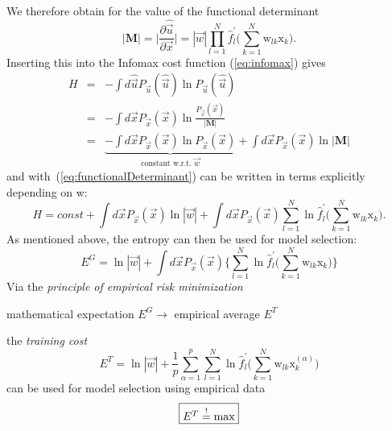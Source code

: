 We therefore obtain for the value of the functional determinant
\begin{equation} \label{eq:functionalDeterminant}
|\mathbf{M}| = 
	\Big| \frac{\partial \widehat{\vec{u}}}{\partial \vec{x}} \Big|
	= |\vec{w}| \prod\limits_{l = 1}^N  \widehat{f}_l^{'} \Bigg( 
		\sum\limits_{k = 1}^N \mathrm{w}_{lk} \mathrm{x}_k \Bigg).
\end{equation}
Inserting this into the Infomax cost function (\ref{eq:infomax}) gives 
\begin{eqnarray}
H & = & -\int d \widehat{\vec{u}} P_{\vec{u}} (\widehat{\vec{u}})
  \ln P_{\vec{u}} (\widehat{\vec{u}}) \\
& = &  
-\int d \vec{x} P_{\vec{x}} (\vec{x}) \ln \frac{P_{\vec{x}}(\vec{x})}{|\mathbf{M}|} \\
& = & 
\underbrace{-\int d \vec{x} P_{\vec{x}} (\vec{x}) \ln P_{\vec{x}}(\vec{x})}_{ \text{constant w.r.t. } \vec{w} } +
\int d \vec{x} P_{\vec{x}} (\vec{x}) \ln |\mathbf{M}|
\end{eqnarray}
and with~(\ref{eq:functionalDeterminant}) can be written in terms explicitly depending on w:
\begin{equation}
	H = const + \int d \vec{x} P_{\vec{x}} (\vec{x}) \ln |\vec{w}|
		+ \int d \vec{x} P_{\vec{x}} (\vec{x}) \sum\limits_{l = 1}^N
			\ln \widehat{f}_l^{'} \Bigg( \sum\limits_{k = 1}^N 
			\mathrm{w}_{lk} \mathrm{x}_k \Bigg).
\end{equation}
As mentioned above, the entropy can then be used for model selection:
\begin{equation} \tag{generalization cost}
	E^G = \ln |\vec{w}| + \int d \vec{x} P_{\vec{x}} (\vec{x})
		\Bigg\{ \sum\limits_{l = 1}^N \ln
			\widehat{f}_l^{'} \Bigg( \sum\limits_{k = 1}^N 
			\mathrm{w}_{lk} \mathrm{x}_k \Bigg)
		\Bigg\}
\end{equation}
Via the \emph{principle of empirical risk minimization}
\begin{center}
mathematical expectation $E^G \longrightarrow$ empirical average $E^T$
\end{center}
the \emph{training cost}
\begin{equation} \label{eq:trainingCost}
	E^T = \ln |\vec{w}| + \frac{1}{p} \sum\limits_{\alpha = 1}^p
		\sum\limits_{l = 1}^N \ln \widehat{f}_l^{'} \Bigg( 
		\sum\limits_{k = 1}^N \mathrm{w}_{lk} 
		\mathrm{x}_k^{(\alpha)} \Bigg)
\end{equation}
can be used for model selection using empirical data 
\begin{equation}
	\fbox{$ E^T \stackrel{\mathrm{!}}{=} \max $}
\end{equation}

